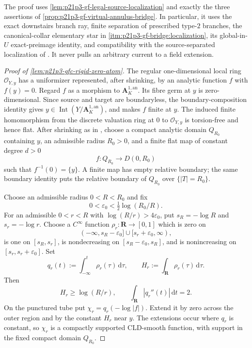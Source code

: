 The proof uses \cref{lem:p21p3-gf-legal-source-localization} and exactly the
three assertions of
\cref{prop:p21p3-gf-virtual-annulus-bridge}.  In particular, it uses the
exact downstairs branch ray, finite separation of prescribed type-$2$
branches, the canonical-collar elementary star in
\cref{itm:p21p3-gf-bridge:localization}, its
global-in-\(U\) exact-preimage identity, and compatibility with the
source-separated localization of \cite[Theorem~16.8.5]{CLD25}.  It never
pulls an arbitrary current to a field extension.

\begin{proof}[Proof of \cref{lem:p21p3-gfc-rigid-zero-atom}]
The regular one-dimensional local ring $\mathcal O_{Y,y}$ has a
uniformizer represented, after shrinking, by an analytic function $f$
with $f(y)=0$.  Regard $f$ as a morphism to
$\mathbf A^{1,\mathrm{an}}_K$.  Its fibre germ at $y$ is
zero-dimensional.  Since source and target are boundaryless, the
boundary-composition identity \cite[(11.4.1.3)]{CLD25} gives
$y\in\operatorname{Int}(Y/\mathbf A^{1,\mathrm{an}}_K)$, and
\cite[Lemma~11.6.5(a)]{CLD25} makes $f$ finite at $y$.  The induced
finite homomorphism from the discrete valuation ring at $0$ to
$\mathcal O_{Y,y}$ is torsion-free and hence flat.  After shrinking as
in \cite[\S11.6.3]{CLD25}, choose a compact analytic domain $Q_{R_0}$
containing $y$, an admissible radius $R_0>0$, and a finite flat map of
constant degree $d>0$
\begin{equation}
\label{eq:p21p3-gfc-finite-rigid-tube}
             f:Q_{R_0}\longrightarrow D(0,R_0)
\end{equation}
such that $f^{-1}(0)=\{y\}$.  A finite map has empty relative boundary;
the same boundary identity puts the relative boundary of $Q_{R_0}$
over $\{|T|=R_0\}$.

Choose an admissible radius $0<R<R_0$ and fix
\[
 0<\varepsilon_0<\tfrac12\log(R_0/R).
\]
For an admissible $0<r<R$ with
$\log(R/r)>4\varepsilon_0$, put $s_R=-\log R$ and
$s_r=-\log r$.  Choose a $C^\infty$ function
$\rho_r:\mathbf R\to[0,1]$ which is zero on
\[
 (-\infty,s_R-\varepsilon_0]\cup[s_r+\varepsilon_0,\infty),
\]
is one on $[s_R,s_r]$, is nondecreasing on
$[s_R-\varepsilon_0,s_R]$, and is nonincreasing on
$[s_r,s_r+\varepsilon_0]$.  Set
\[
 q_r(t):=\int_{-\infty}^{t}\rho_r(\tau)\,\mathrm d\tau,
 \qquad
 H_r:=\int_{\mathbf R}\rho_r(\tau)\,\mathrm d\tau .
\]
Then
\begin{equation}
\label{eq:p21p3-gfc-radial-data}
 H_r\geq\log(R/r),
 \qquad
 \int_{\mathbf R}|q_r''(t)|\,\mathrm dt=2.
\end{equation}
On the punctured tube put
$\chi_r=q_r(-\log|f|)$.  Extend it by zero across the outer region and
by the constant $H_r$ near $y$.  The extensions occur where $q_r$
is constant, so $\chi_r$ is a compactly supported CLD-smooth function,
with support in the fixed compact domain $Q_{R_0}$.


\end{proof}
